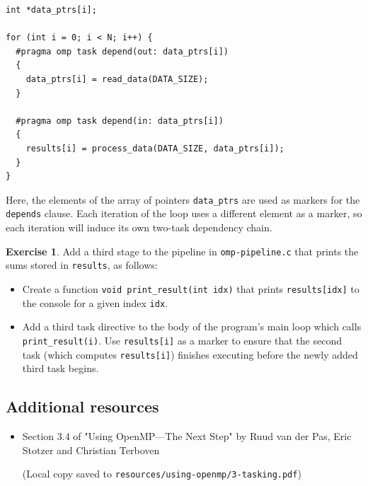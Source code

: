 \documentclass{article}
\newcommand{\resource}[1]{(Local copy saved to \texttt{#1})}
\theoremstyle{definition}
\newtheorem{exercise}{Exercise}
\begin{document}
\begin{verbatim}
int *data_ptrs[i];

for (int i = 0; i < N; i++) {
  #pragma omp task depend(out: data_ptrs[i])
  {
    data_ptrs[i] = read_data(DATA_SIZE);
  }
  
  #pragma omp task depend(in: data_ptrs[i])
  {
    results[i] = process_data(DATA_SIZE, data_ptrs[i]);
  }
}
\end{verbatim}

Here, the elements of the array of pointers \texttt{data\_ptrs} are used as markers for the \texttt{depends} clause. Each iteration of the loop uses a different element as a marker, so each iteration will induce its own two-task dependency chain. 

\begin{exercise}
Add a third stage to the pipeline in \texttt{omp-pipeline.c} that prints the sums stored in \texttt{results}, as follows:
\begin{itemize}
    \item Create a function \texttt{void print\_result(int idx)} that prints \texttt{results[idx]} to the console for a given index \texttt{idx}. 
    
    \item Add a third task directive to the body of the program's main loop which calls \texttt{print\_result(i)}. Use \texttt{results[i]} as a marker to ensure that the second task (which computes \texttt{results[i]}) finishes executing before the newly added third task begins.
\end{itemize}
\end{exercise}

\subsection*{Additional resources}

\begin{itemize}
    \item Section 3.4 of "Using OpenMP—The Next Step" by Ruud van der Pas, Eric Stotzer and Christian Terboven
    
    \resource{resources/using-openmp/3-tasking.pdf}
\end{itemize}
\end{document}
